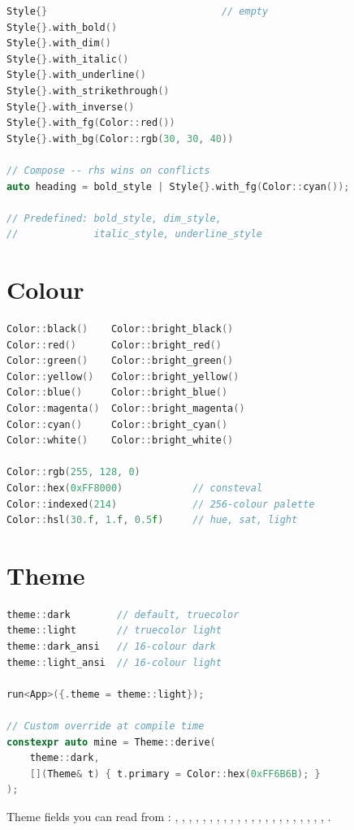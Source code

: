 \begin{lstlisting}[language=C++]
Style{}                              // empty
Style{}.with_bold()
Style{}.with_dim()
Style{}.with_italic()
Style{}.with_underline()
Style{}.with_strikethrough()
Style{}.with_inverse()
Style{}.with_fg(Color::red())
Style{}.with_bg(Color::rgb(30, 30, 40))

// Compose -- rhs wins on conflicts
auto heading = bold_style | Style{}.with_fg(Color::cyan());

// Predefined: bold_style, dim_style,
//             italic_style, underline_style
\end{lstlisting}

\section{Colour}

\begin{lstlisting}[language=C++]
Color::black()    Color::bright_black()
Color::red()      Color::bright_red()
Color::green()    Color::bright_green()
Color::yellow()   Color::bright_yellow()
Color::blue()     Color::bright_blue()
Color::magenta()  Color::bright_magenta()
Color::cyan()     Color::bright_cyan()
Color::white()    Color::bright_white()

Color::rgb(255, 128, 0)
Color::hex(0xFF8000)            // consteval
Color::indexed(214)             // 256-colour palette
Color::hsl(30.f, 1.f, 0.5f)     // hue, sat, light
\end{lstlisting}

\section{Theme}

\begin{lstlisting}[language=C++]
theme::dark        // default, truecolor
theme::light       // truecolor light
theme::dark_ansi   // 16-colour dark
theme::light_ansi  // 16-colour light

run<App>({.theme = theme::light});

// Custom override at compile time
constexpr auto mine = Theme::derive(
    theme::dark,
    [](Theme& t) { t.primary = Color::hex(0xFF6B6B); }
);
\end{lstlisting}

\noindent Theme fields you can read from :
, , ,
, , , ,
, , ,
, , ,
, ,
, , ,
, , ,
, .

